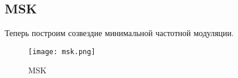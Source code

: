 \subsection{MSK}

Теперь построим созвездие минимальной частотной модуляции. 
\begin{figure}[H]
	\begin{center}
		\texttt{[image: msk.png]}
		\caption{MSK} 
		\label{pic:msk} %
	\end{center}
\end{figure} 



\parindent=1cm %


